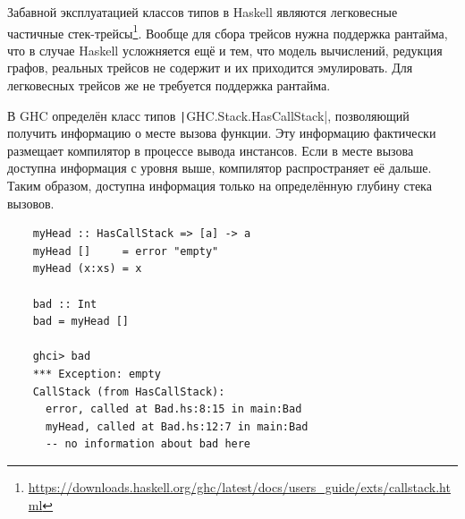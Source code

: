 Забавной эксплуатацией классов типов в Haskell являются легковесные частичные стек-трейсы\footnote{\url{https://downloads.haskell.org/ghc/latest/docs/users_guide/exts/callstack.html}}.
Вообще для сбора трейсов нужна поддержка рантайма, что в случае Haskell усложняется ещё и тем, что модель вычислений, редукция графов, реальных трейсов не содержит и их приходится эмулировать.
Для легковесных трейсов же не требуется поддержка рантайма.

В GHC определён класс типов \texttt|GHC.Stack.HasCallStack|, позволяющий получить информацию о месте вызова функции.
Эту информацию фактически размещает компилятор в процессе вывода инстансов.
Если в месте вызова доступна информация с уровня выше, компилятор распространяет её дальше.
Таким образом, доступна информация только на определённую глубину стека вызовов.
\begin{verbatim}
    myHead :: HasCallStack => [a] -> a
    myHead []     = error "empty"
    myHead (x:xs) = x

    bad :: Int
    bad = myHead []

    ghci> bad
    *** Exception: empty
    CallStack (from HasCallStack):
      error, called at Bad.hs:8:15 in main:Bad
      myHead, called at Bad.hs:12:7 in main:Bad
      -- no information about bad here
\end{verbatim}
